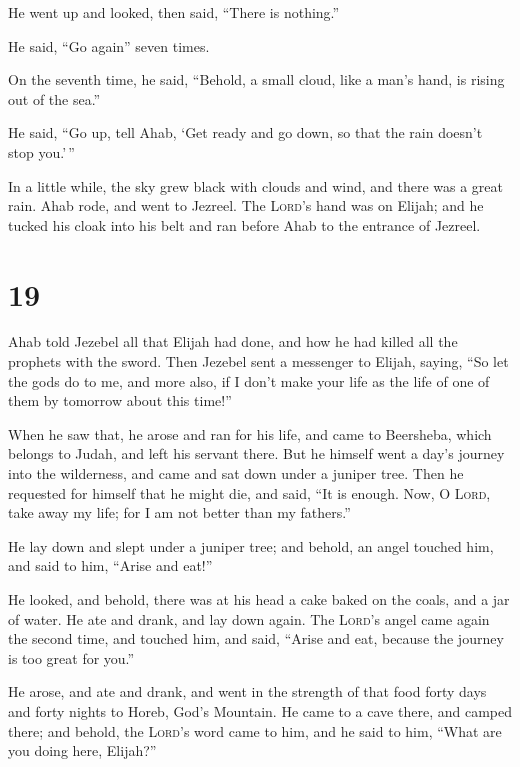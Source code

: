 He went up and looked, then said, ``There is nothing.''

He said, ``Go again'' seven times.

 On the seventh time, he said, ``Behold, a small cloud,
like a man's hand, is rising out of the sea.''

He said, ``Go up, tell Ahab, `Get ready and go down, so that the rain
doesn't stop you.'\,''

 In a little while, the sky grew black with clouds and
wind, and there was a great rain. Ahab rode, and went to Jezreel.
 The \textsc{Lord}'s hand was on Elijah; and he tucked
his cloak into his belt and ran before Ahab to the entrance of Jezreel.

\hypertarget{section-18}{%
\section{19}\label{section-18}}

 Ahab told Jezebel all that Elijah had done, and how he
had killed all the prophets with the sword.  Then Jezebel
sent a messenger to Elijah, saying, ``So let the gods do to me, and more
also, if I don't make your life as the life of one of them by tomorrow
about this time!''

 When he saw that, he arose and ran for his life, and came
to Beersheba, which belongs to Judah, and left his servant there.
 But he himself went a day's journey into the wilderness,
and came and sat down under a juniper tree. Then he requested for
himself that he might die, and said, ``It is enough. Now, O
\textsc{Lord}, take away my life; for I am not better than my fathers.''

 He lay down and slept under a juniper tree; and behold,
an angel touched him, and said to him, ``Arise and eat!''

 He looked, and behold, there was at his head a cake baked
on the coals, and a jar of water. He ate and drank, and lay down again.
 The \textsc{Lord}'s angel came again the second time, and
touched him, and said, ``Arise and eat, because the journey is too great
for you.''

 He arose, and ate and drank, and went in the strength of
that food forty days and forty nights to Horeb, God's Mountain.
 He came to a cave there, and camped there; and behold,
the \textsc{Lord}'s word came to him, and he said to him, ``What are you
doing here, Elijah?''

